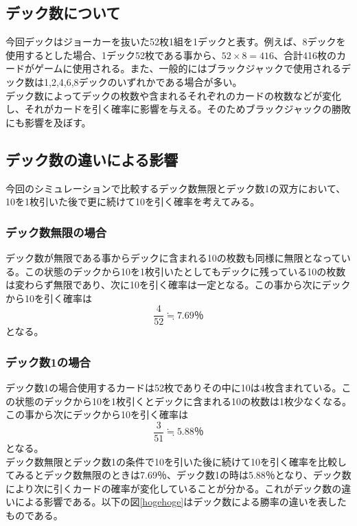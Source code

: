 \subsection{デック数について}
今回デックはジョーカーを抜いた52枚1組を1デックと表す。例えば、8デックを使用するとした場合、1デック52枚である事から、$52×8=416$、合計416枚のカードがゲームに使用される。また、一般的にはブラックジャックで使用されるデック数は1,2,4,6,8デックのいずれかである場合が多い。\\
デック数によってデックの枚数や含まれるそれぞれのカードの枚数などが変化し、それがカードを引く確率に影響を与える。そのためブラックジャックの勝敗にも影響を及ぼす。


\subsection{デック数の違いによる影響}
今回のシミュレーションで比較するデック数無限とデック数1の双方において、10を1枚引いた後で更に続けて10を引く確率を考えてみる。
\subsubsection{デック数無限の場合}
デック数が無限である事からデックに含まれる10の枚数も同様に無限となっている。この状態のデックから10を1枚引いたとしてもデックに残っている10の枚数は変わらず無限であり、次に10を引く確率は一定となる。この事から次にデックから10を引く確率は\begin{equation}\frac{4}{52} \fallingdotseq 7.69％\end{equation}となる。\\
\subsubsection{デック数1の場合}
デック数1の場合使用するカードは52枚でありその中に10は4枚含まれている。この状態のデックから10を1枚引くとデックに含まれる10の枚数は1枚少なくなる。この事から次にデックから10を引く確率は\begin{equation}\frac{3}{51}\fallingdotseq5.88％\end{equation}となる。\\
デック数無限とデック数1の条件で10を引いた後に続けて10を引く確率を比較してみるとデック数無限のときは7.69％、デック数1の時は5.88％となり、デック数により次に引くカードの確率が変化していることが分かる。これがデック数の違いによる影響である。以下の図\ref{hogehoge}はデック数による勝率の違いを表したものである。

